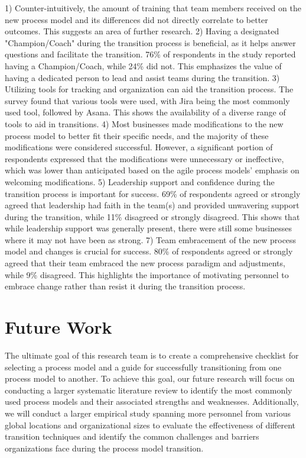 \documentclass[conference]{IEEEtran}
\begin{document}
1) Counter-intuitively, the amount of training that team members received on the new process model and its differences did not directly correlate to better outcomes.  This suggests an area of further research.
2) Having a designated "Champion/Coach" during the transition process is beneficial, as it helps answer questions and facilitate the transition. 76\% of respondents in the study reported having a Champion/Coach, while 24\% did not. This emphasizes the value of having a dedicated person to lead and assist teams during the transition.
3) Utilizing tools for tracking and organization can aid the transition process. The survey found that various tools were used, with Jira being the most commonly used tool, followed by Asana. This shows the availability of a diverse range of tools to aid in transitions.
4) Most businesses made modifications to the new process model to better fit their specific needs, and the majority of these modifications were considered successful. However, a significant portion of respondents expressed that the modifications were unnecessary or ineffective, which was lower than anticipated based on the agile process models' emphasis on welcoming modifications.
5) Leadership support and confidence during the transition process is important for success. 69\% of respondents agreed or strongly agreed that leadership had faith in the team(s) and provided unwavering support during the transition, while 11\% disagreed or strongly disagreed. This shows that while leadership support was generally present, there were still some businesses where it may not have been as strong.
7) Team embracement of the new process model and changes is crucial for success. 80\% of respondents agreed or strongly agreed that their team embraced the new process paradigm and adjustments, while 9\% disagreed. This highlights the importance of motivating personnel to embrace change rather than resist it during the transition process.

\section{Future Work}
The ultimate goal of this research team is to create a comprehensive checklist for selecting a process model and a guide for successfully transitioning from one process model to another. To achieve this goal, our future research will focus on conducting a larger systematic literature review to identify the most commonly used process models and their associated strengths and weaknesses. Additionally, we will conduct a larger empirical study spanning more personnel from various global locations and organizational sizes to evaluate the effectiveness of different transition techniques and identify the common challenges and barriers organizations face during the process model transition.
\end{document}
